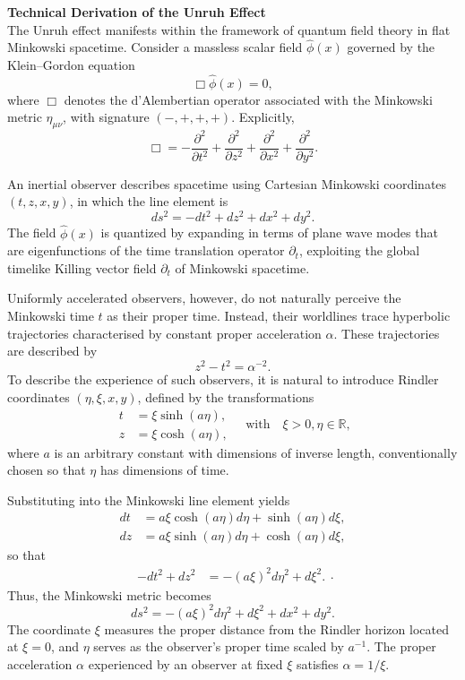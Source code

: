 \begin{technical}
{\Large\textbf{Technical Derivation of the Unruh Effect}}\\[0.3em]

The Unruh effect manifests within the framework of quantum field theory in flat Minkowski spacetime. Consider a massless scalar field $\hat{\phi}(x)$ governed by the Klein–Gordon equation
\[
\Box \hat{\phi}(x) = 0,
\]
where $\Box$ denotes the d'Alembertian operator associated with the Minkowski metric $\eta_{\mu\nu}$, with signature $(-,+,+,+)$. Explicitly,
\[
\Box = -\frac{\partial^2}{\partial t^2} + \frac{\partial^2}{\partial z^2} + \frac{\partial^2}{\partial x^2} + \frac{\partial^2}{\partial y^2}.
\]

An inertial observer describes spacetime using Cartesian Minkowski coordinates $(t, z, x, y)$, in which the line element is
\[
ds^2 = -dt^2 + dz^2 + dx^2 + dy^2.
\]
The field $\hat{\phi}(x)$ is quantized by expanding in terms of plane wave modes that are eigenfunctions of the time translation operator $\partial_t$, exploiting the global timelike Killing vector field $\partial_t$ of Minkowski spacetime.

Uniformly accelerated observers, however, do not naturally perceive the Minkowski time $t$ as their proper time. Instead, their worldlines trace hyperbolic trajectories characterised by constant proper acceleration $\alpha$. These trajectories are described by
\[
z^2 - t^2 = \alpha^{-2}.
\]
To describe the experience of such observers, it is natural to introduce Rindler coordinates $(\eta, \xi, x, y)$, defined by the transformations
\[
\begin{aligned}
t &= \xi \sinh(a\eta), \\
z &= \xi \cosh(a\eta),
\end{aligned}
\quad \text{with} \quad \xi > 0,  \eta \in \mathbb{R},
\]
where $a$ is an arbitrary constant with dimensions of inverse length, conventionally chosen so that $\eta$ has dimensions of time. 

Substituting into the Minkowski line element yields
\[
\begin{aligned}
dt &= a \xi \cosh(a\eta) d\eta + \sinh(a\eta) d\xi, \\
dz &= a \xi \sinh(a\eta) d\eta + \cosh(a\eta) d\xi,
\end{aligned}
\]
so that
\[
\begin{aligned}
-dt^2 + dz^2 &= -(a\xi)^2 d\eta^2 + d\xi^2.
\end{aligned}.
\]
Thus, the Minkowski metric becomes
\[
ds^2 = - (a\xi)^2 d\eta^2 + d\xi^2 + dx^2 + dy^2.
\]
The coordinate $\xi$ measures the proper distance from the Rindler horizon located at $\xi = 0$, and $\eta$ serves as the observer's proper time scaled by $a^{-1}$. The proper acceleration $\alpha$ experienced by an observer at fixed $\xi$ satisfies $\alpha = 1/\xi$.


\end{technical}
